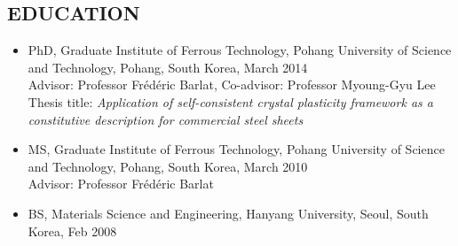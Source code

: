 \documentclass{res}
\begin{document}
\begin{resume}
  \section{EDUCATION}
  \begin{itemize}
  \item PhD, Graduate Institute of Ferrous Technology, Pohang University of Science and Technology, Pohang, South Korea, March 2014\\
    Advisor: Professor Fr\'ed\'eric Barlat, Co-advisor: Professor Myoung-Gyu Lee\\
    Thesis title: {\it Application of self-consistent crystal plasticity framework as a constitutive description for commercial steel sheets}
  \item MS, Graduate Institute of Ferrous Technology, Pohang University of Science and Technology, Pohang, South Korea, March 2010\\
    Advisor: Professor Fr\'ed\'eric Barlat
  \item BS, Materials Science and Engineering, Hanyang University, Seoul, South Korea, Feb 2008
  \end{itemize}


\end{resume}
\end{document}
